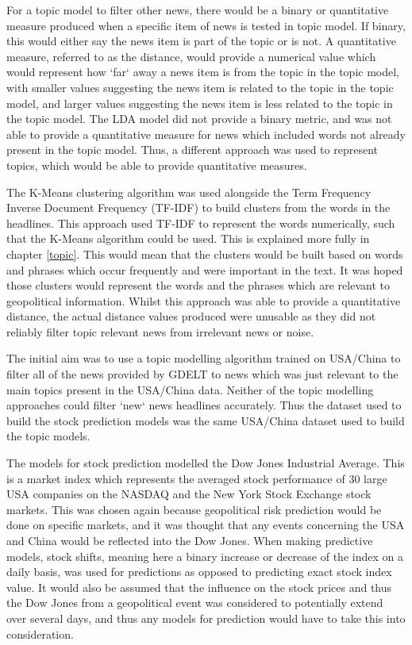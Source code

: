 For a topic model to filter other news, there would be a binary or quantitative measure produced when a specific item of news is tested in topic model. If binary, this would either say the news item is part of the topic or is not. A quantitative measure, referred to as the distance, would provide a numerical value which would represent how `far` away a news item is from the topic in the topic model, with smaller values suggesting the news item is related to the topic in the topic model, and larger values suggesting the news item is less related to the topic in the topic model. The LDA model did not provide a binary metric, and was not able to provide a quantitative measure for news which included words not already present in the topic model. Thus, a different approach was used to represent topics, which would be able to provide quantitative measures.  

The K-Means clustering algorithm was used alongside the Term Frequency Inverse Document Frequency (TF-IDF) to build clusters from the words in the headlines. This approach used TF-IDF to represent the words numerically, such that the K-Means algorithm could be used. This is explained more fully in chapter \ref{topic}. This would mean that the clusters would be built based on words and phrases which occur frequently and were important in the text. It was hoped those clusters would represent the words and the phrases which are relevant to geopolitical information. Whilst this approach was able to provide a quantitative distance, the actual distance values produced were unusable as they did not reliably filter topic relevant news from irrelevant news or noise. 

The initial aim was to use a topic modelling algorithm trained on USA/China to filter all of the news provided by GDELT to news which was just relevant to the main topics present in the USA/China data. Neither of the topic modelling approaches could filter `new` news headlines accurately. Thus the dataset used to build the stock prediction models was the same USA/China dataset used to build the topic models. 

The models for stock prediction modelled the Dow Jones Industrial Average. This is a market index which represents the averaged stock performance of 30 large USA companies on the NASDAQ and the New York Stock Exchange stock markets. This was chosen again because geopolitical risk prediction would be done on specific markets, and it was thought that any events concerning the USA and China would be reflected into the Dow Jones. When making predictive models, stock shifts, meaning here a binary increase or decrease of the index on a daily basis, was used for predictions as opposed to predicting exact stock index value. It would also be assumed that the influence on the stock prices and thus the Dow Jones from a geopolitical event was considered to potentially extend over several days, and thus any models for prediction would have to take this into consideration.

